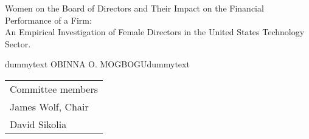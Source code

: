 \begin{titlepage}
\vspace*{0.4in}
\begin{center}
\textnormal{Women on the Board of Directors and Their Impact on the Financial Performance of a Firm:\\
An Empirical Investigation of Female Directors in the United States Technology Sector.}
\end{center}\vspace*{0.4in}\hfill \break
\textnormal{\noindent\color{white}dummytext\hfill\color{black} OBINNA O. MOGBOGU\hfill\color{white}dummytext}\\
[134mm]
\color{black}%
\begin{longtable}[r]{l}
  \textnormal{Committee members}\\
  \textnormal{James Wolf, Chair}\\
  \textnormal{David Sikolia}\\*
\end{longtable}
\end{titlepage}
